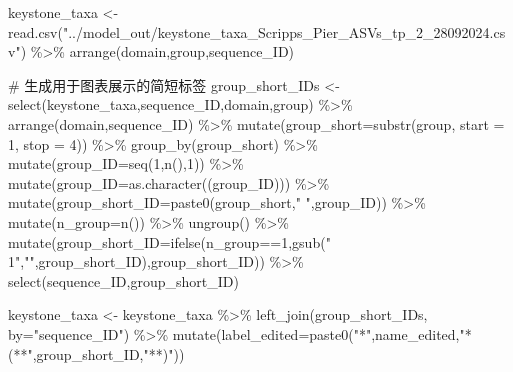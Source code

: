 \documentclass[
  letterpaper,
  DIV=11,
  numbers=noendperiod]{scrreprt}
\newenvironment{Shaded}{\begin{snugshade}}{\end{snugshade}}
\newcommand{\AttributeTok}[1]{\textcolor[rgb]{0.40,0.45,0.13}{#1}}
\newcommand{\CommentTok}[1]{\textcolor[rgb]{0.37,0.37,0.37}{#1}}
\newcommand{\DecValTok}[1]{\textcolor[rgb]{0.68,0.00,0.00}{#1}}
\newcommand{\FunctionTok}[1]{\textcolor[rgb]{0.28,0.35,0.67}{#1}}
\newcommand{\NormalTok}[1]{\textcolor[rgb]{0.00,0.23,0.31}{#1}}
\newcommand{\OtherTok}[1]{\textcolor[rgb]{0.00,0.23,0.31}{#1}}
\newcommand{\SpecialCharTok}[1]{\textcolor[rgb]{0.37,0.37,0.37}{#1}}
\newcommand{\StringTok}[1]{\textcolor[rgb]{0.13,0.47,0.30}{#1}}
\begin{document}
\begin{Shaded}
\begin{Highlighting}[]
\NormalTok{keystone\_taxa }\OtherTok{\textless{}{-}} \FunctionTok{read.csv}\NormalTok{(}\StringTok{"../model\_out/keystone\_taxa\_Scripps\_Pier\_ASVs\_tp\_2\_28092024.csv"}\NormalTok{)  }\SpecialCharTok{\%\textgreater{}\%}
  \FunctionTok{arrange}\NormalTok{(domain,group,sequence\_ID)}

\CommentTok{\# 生成用于图表展示的简短标签}
\NormalTok{group\_short\_IDs }\OtherTok{\textless{}{-}} \FunctionTok{select}\NormalTok{(keystone\_taxa,sequence\_ID,domain,group) }\SpecialCharTok{\%\textgreater{}\%}
  \FunctionTok{arrange}\NormalTok{(domain,sequence\_ID) }\SpecialCharTok{\%\textgreater{}\%}
  \FunctionTok{mutate}\NormalTok{(}\AttributeTok{group\_short=}\FunctionTok{substr}\NormalTok{(group, }\AttributeTok{start =} \DecValTok{1}\NormalTok{, }\AttributeTok{stop =} \DecValTok{4}\NormalTok{)) }\SpecialCharTok{\%\textgreater{}\%}
  \FunctionTok{group\_by}\NormalTok{(group\_short) }\SpecialCharTok{\%\textgreater{}\%}
  \FunctionTok{mutate}\NormalTok{(}\AttributeTok{group\_ID=}\FunctionTok{seq}\NormalTok{(}\DecValTok{1}\NormalTok{,}\FunctionTok{n}\NormalTok{(),}\DecValTok{1}\NormalTok{)) }\SpecialCharTok{\%\textgreater{}\%}
  \FunctionTok{mutate}\NormalTok{(}\AttributeTok{group\_ID=}\FunctionTok{as.character}\NormalTok{((group\_ID))) }\SpecialCharTok{\%\textgreater{}\%}
  \FunctionTok{mutate}\NormalTok{(}\AttributeTok{group\_short\_ID=}\FunctionTok{paste0}\NormalTok{(group\_short,}\StringTok{" "}\NormalTok{,group\_ID)) }\SpecialCharTok{\%\textgreater{}\%}
  \FunctionTok{mutate}\NormalTok{(}\AttributeTok{n\_group=}\FunctionTok{n}\NormalTok{()) }\SpecialCharTok{\%\textgreater{}\%}
  \FunctionTok{ungroup}\NormalTok{() }\SpecialCharTok{\%\textgreater{}\%}
  \FunctionTok{mutate}\NormalTok{(}\AttributeTok{group\_short\_ID=}\FunctionTok{ifelse}\NormalTok{(n\_group}\SpecialCharTok{==}\DecValTok{1}\NormalTok{,}\FunctionTok{gsub}\NormalTok{(}\StringTok{" 1"}\NormalTok{,}\StringTok{""}\NormalTok{,group\_short\_ID),group\_short\_ID)) }\SpecialCharTok{\%\textgreater{}\%}
  \FunctionTok{select}\NormalTok{(sequence\_ID,group\_short\_ID)}

\NormalTok{keystone\_taxa }\OtherTok{\textless{}{-}}\NormalTok{ keystone\_taxa }\SpecialCharTok{\%\textgreater{}\%}
  \FunctionTok{left\_join}\NormalTok{(group\_short\_IDs, }\AttributeTok{by=}\StringTok{"sequence\_ID"}\NormalTok{) }\SpecialCharTok{\%\textgreater{}\%}
  \FunctionTok{mutate}\NormalTok{(}\AttributeTok{label\_edited=}\FunctionTok{paste0}\NormalTok{(}\StringTok{"*"}\NormalTok{,name\_edited,}\StringTok{"* (**"}\NormalTok{,group\_short\_ID,}\StringTok{"**)"}\NormalTok{))}
\end{Highlighting}
\end{Shaded}
\end{document}
